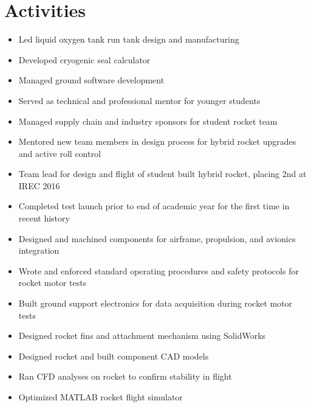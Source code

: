 \documentclass{resume}
\begin{document}
\section{Activities}
\begin{itemize}
    \item Led liquid oxygen tank run tank design and manufacturing
    \item Developed cryogenic seal calculator
    \item Managed ground software development
    \item Served as technical and professional mentor for younger students
\end{itemize}
\begin{itemize}
    \item Managed supply chain and industry sponsors for student rocket team
    \item Mentored new team members in design process for hybrid rocket upgrades and active roll control
\end{itemize}
\begin{itemize}
    \item Team lead for design and flight of student built hybrid rocket, placing 2nd at IREC 2016
    \item Completed test launch prior to end of academic year for the first time in recent history
    \item Designed and machined components for airframe, propulsion, and avionics integration
\end{itemize}
\begin{itemize}
    \item Wrote and enforced standard operating procedures and safety protocols for rocket motor tests
    \item Built ground support electronics for data acquisition during rocket motor tests
    \item Designed rocket fins and attachment mechanism using SolidWorks
\end{itemize}
\begin{itemize}
    \item Designed rocket and built component CAD models
    \item Ran CFD analyses on rocket to confirm stability in flight
    \item Optimized MATLAB rocket flight simulator
\end{itemize}
\end{document}
